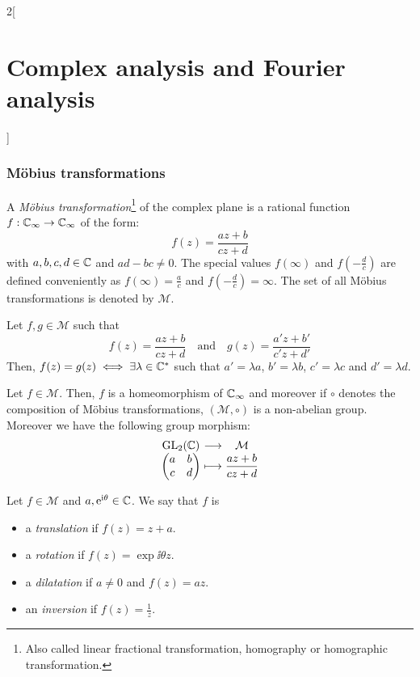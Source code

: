 \documentclass[../../../main.tex]{subfiles}
\begin{document}
\begin{multicols}{2}[\section{Complex analysis and Fourier analysis}]
  \subsubsection{Möbius transformations}
  \begin{definition}
    A \emph{Möbius transformation}\footnote{Also called linear fractional transformation, homography or homographic transformation.} of the complex plane is a rational function $f:\mathbb{C}_\infty\rightarrow\mathbb{C}_\infty$ of the form: $$f(z)=\frac{az+b}{cz+d}$$ with $a,b,c,d\in\mathbb{C}$ and $ad-bc\ne 0$. The special values $f(\infty)$ and $f\left(-\frac{d}{c}\right)$ are defined conveniently as $f(\infty)=\frac{a}{c}$ and $f\left(-\frac{d}{c}\right)=\infty$. The set of all Möbius transformations is denoted by $\mathcal{M}$.
  \end{definition}
  \begin{proposition}
    Let $f,g\in\mathcal{M}$ such that $$f(z)=\frac{az+b}{cz+d}\quad\text{and}\quad g(z)=\frac{a'z+b'}{c'z+d'}$$
    Then, $f(z)=g(z)\iff \exists\lambda\in\mathbb{C}^*$ such that $a'=\lambda a$, $b'=\lambda b$, $c'=\lambda c$ and $d'=\lambda d$.
  \end{proposition}
  \begin{proposition}
    Let $f\in\mathcal{M}$. Then, $f$ is a homeomorphism of $\mathbb{C}_\infty$ and moreover if $\circ$ denotes the composition of Möbius transformations, $(\mathcal{M},\circ)$ is a non-abelian group. Moreover we have the following group morphism:
    $$\function{}{\GL_2(\CC)}{\mathcal{M}}{\begin{pmatrix}
          a & b \\
          c & d
        \end{pmatrix}}{\displaystyle\frac{az+b}{cz+d}}$$
  \end{proposition}
  \begin{definition}
    Let $f\in\mathcal{M}$ and $a,\mathrm{e}^{\mathrm{i}\theta}\in\mathbb{C}$. We say that $f$ is
    \begin{itemize}
      \item a \emph{translation} if $f(z)=z+a$.
      \item a \emph{rotation} if $f(z)=\exp{\ii\theta}z$.
      \item a \emph{dilatation} if $a\ne 0$ and $f(z)=az$.
      \item an \emph{inversion} if $f(z)=\frac{1}{z}$.
    \end{itemize}
  \end{definition}
  \begin{theorem}

\end{theorem}
\end{multicols}
\end{document}
